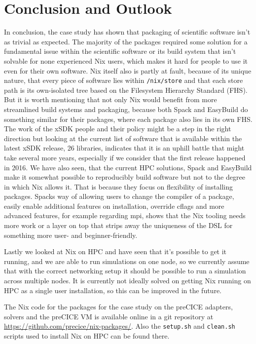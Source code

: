 \documentclass[conference,final,a4paper]{IEEEtran}
\begin{document}
\section{Conclusion and Outlook}

In conclusion, the case study has shown that packaging of scientific software isn't as trivial as expected.
The majority of the packages required some solution for a fundamental issue within the scientific software or its build system that isn't solvable for none experienced Nix users, which makes it hard for people to use it even for their own software.
Nix itself also is partly at fault, because of its unique nature, that every piece of software lies within \texttt{/nix/store} and that each store path is its own-isolated tree based on the Filesystem Hierarchy Standard (FHS).
But it is worth mentioning that not only Nix would benefit from more streamlined build systems and packaging, because both Spack and EasyBuild do something similar for their packages, where each package also lies in its own FHS.
The work of the xSDK people and their policy might be a step in the right direction but looking at the current list of software that is available within the latest xSDK release, 26 libraries, indicates that it is an uphill battle that might take several more years, especially if we consider that the first release happened in 2016.
We have also seen, that the current HPC solutions, Spack and EasyBuild make it somewhat possible to reproducibly build software but not to the degree in which Nix allows it.
That is because they focus on flexibility of installing packages.
Spacks way of allowing users to change the compiler of a package, easily enable additional features on installation, override cflags and more advanced features, for example regarding mpi, shows that the Nix tooling needs more work or a layer on top that strips away the uniqueness of the DSL for something more user- and beginner-friendly.

Lastly we looked at Nix on HPC and have seen that it's possible to get it running, and we are able to run simulations on one node, so we currently assume that with the correct networking setup it should be possible to run a simulation across multiple nodes.
It is currently not ideally solved on getting Nix running on HPC as a single user installation, so this can be improved in the future.

The Nix code for the packages for the case study on the preCICE adapters, solvers and the preCICE VM is available online in a git repository at \url{https://github.com/precice/nix-packages/}.
Also the \texttt{setup.sh} and \texttt{clean.sh} scripts used to install Nix on HPC can be found there.\\
\end{document}
